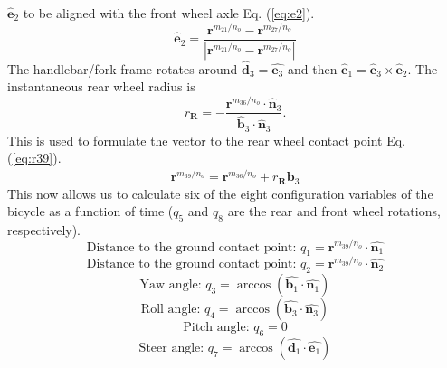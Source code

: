 \begin{appendices}
$\hat{\mathbf{e}}_2$ to be aligned with the front wheel axle Eq.
(\ref{eq:e2}).
\begin{equation}
    \hat{\mathbf{e}}_2=\frac{\mathbf{r}^{{m_{21}}/{n_o}}-\mathbf{r}^{{m_{27}}/{n_o}}}
                            {|\mathbf{r}^{{m_{21}}/{n_o}}-\mathbf{r}^{{m_{27}}/{n_o}}|}
\label{eq:e2}
\end{equation}
The handlebar/fork frame rotates around $\hat{\mathbf{d}}_3=\hat{\mathbf{e}_3}$
and then $\hat{\mathbf{e}}_1=\hat{\mathbf{e}}_3\times\hat{\mathbf{e}}_2$. The
instantaneous rear wheel radius is
\begin{equation}
    r_\mathbf{R}=
    -\frac{\mathbf{r}^{{m_{36}}/{n_o}}\cdot\hat{\mathbf{n}}_3}
    {\hat{\mathbf{b}}_3\cdot\hat{\mathbf{n}}_3}\textrm{.}
\label{eq:rr}
\end{equation}
This is used to formulate the vector to the rear wheel contact point Eq.
(\ref{eq:r39}).
\begin{equation}
    \mathbf{r}^{{m_{39}}/{n_o}} = \mathbf{r}^{{m_{36}}/{n_o}}+r_\mathbf{R}\hat{\mathbf{b}_3}
\label{eq:r39}
\end{equation}
This now allows us to calculate six of the eight configuration variables of the
bicycle as a function of time ($q_5$ and $q_8$ are the rear and front wheel
rotations, respectively).
\begin{equation}
    \textrm{Distance to the ground contact point: }q_1 = \mathbf{r}^{{m_{39}}/{n_o}}\cdot\hat{\mathbf{n}_1}
\label{eq:q1}
\end{equation}
\begin{equation}
    \textrm{Distance to the ground contact point: }q_2 = \mathbf{r}^{{m_{39}}/{n_o}}\cdot\hat{\mathbf{n}_2}
\label{eq:q2}
\end{equation}
\begin{equation}
    \textrm{Yaw angle: }q_3 = \arccos\left(\hat{\mathbf{b}_1}\cdot\hat{\mathbf{n}_1}\right)
\label{eq:q3}
\end{equation}
\begin{equation}
    \textrm{Roll angle: }q_4 = \arccos\left(\hat{\mathbf{b}_3}\cdot\hat{\mathbf{n}_3}\right)
\label{eq:q4}
\end{equation}
\begin{equation}
    \textrm{Pitch angle: }q_6 = 0
\label{eq:q6}
\end{equation}
\begin{equation}
    \textrm{Steer angle: }q_7 = \arccos\left(\hat{\mathbf{d}_1}\cdot\hat{\mathbf{e}_1}\right)
\label{eq:q7}
\end{equation}
\end{appendices}

